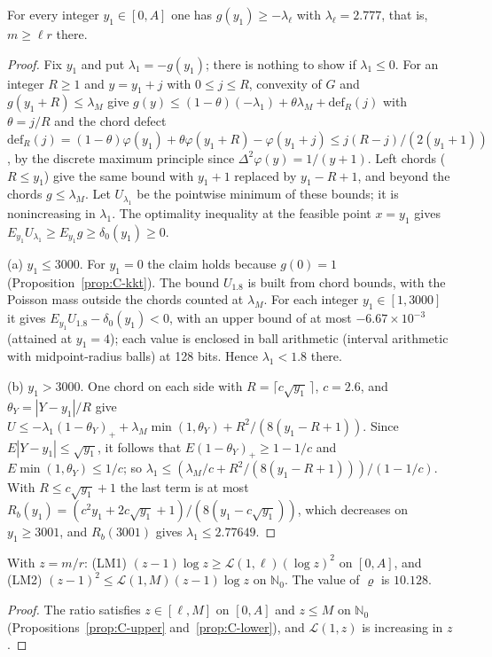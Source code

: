 \begin{proposition}\label{prop:C-lower}
For every integer $y_1\in[0,A]$ one has $g(y_1)\ge-\lambda_\ell$ with $\lambda_\ell=2.777$, that is, $m\ge\ell r$ there.
\end{proposition}
\begin{proof}
Fix $y_1$ and put $\lambda_1=-g(y_1)$; there is nothing to show if $\lambda_1\le0$. For an integer $R\ge1$ and $y=y_1+j$ with $0\le j\le R$, convexity of $G$ and $g(y_1+R)\le\lambda_M$ give $g(y)\le(1-\theta)(-\lambda_1)+\theta\lambda_M+\mathrm{def}_R(j)$ with $\theta=j/R$ and the
chord defect $\mathrm{def}_R(j)=(1-\theta)\varphi(y_1)+\theta\varphi(y_1+R)-\varphi(y_1+j)\le j(R-j)/(2(y_1+1))$, by the discrete maximum
principle since $\Delta^2\varphi(y)=1/(y+1)$. Left chords ($R\le y_1$) give the same bound with $y_1+1$ replaced by $y_1-R+1$, and beyond
the chords $g\le\lambda_M$. Let $U_{\lambda_1}$ be the pointwise minimum of these bounds; it is nonincreasing in $\lambda_1$. The optimality
inequality at the feasible point $x=y_1$ gives $E_{y_1}U_{\lambda_1}\ge E_{y_1}g\ge\delta_0(y_1)\ge0$.

(a) $y_1\le3000$. For $y_1=0$ the claim holds because $g(0)=1$ (Proposition~\ref{prop:C-kkt}). The bound $U_{1.8}$ is built from chord bounds, with the Poisson mass outside the chords counted at
$\lambda_M$. For each integer $y_1\in[1,3000]$ it gives $E_{y_1}U_{1.8}-\delta_0(y_1)<0$, with an upper bound of at most $-6.67\times10^{-3}$
(attained at $y_1=4$); each value is enclosed in ball arithmetic (interval arithmetic with midpoint-radius balls) at 128 bits. Hence $\lambda_1<1.8$ there.

(b) $y_1>3000$. One chord on each side with $R=\lceil c\sqrt{y_1}\,\rceil$, $c=2.6$, and $\theta_Y=|Y-y_1|/R$ give
$U\le-\lambda_1(1-\theta_Y)_++\lambda_M\min(1,\theta_Y)+R^2/(8(y_1-R+1))$. Since $E|Y-y_1|\le\sqrt{y_1}$, it follows that $E(1-\theta_Y)_+\ge1-1/c$ and
$E\min(1,\theta_Y)\le1/c$; so $\lambda_1\le(\lambda_M/c+R^2/(8(y_1-R+1)))/(1-1/c)$. With $R\le c\sqrt{y_1}+1$ the last term is at most
$R_b(y_1)=(c^2y_1+2c\sqrt{y_1}+1)/(8(y_1-c\sqrt{y_1}))$, which decreases on $y_1\ge3001$, and $R_b(3001)$ gives $\lambda_1\le2.77649$.
\end{proof}

\begin{corollary}\label{cor:C-LM}
With $z=m/r$: (LM1) $(z-1)\log z\ge\mathcal L(1,\ell)(\log z)^2$ on $[0,A]$, and (LM2) $(z-1)^2\le\mathcal L(1,M)(z-1)\log z$ on
$\mathbb N_0$. The value of $\varrho$ is $10.128$.
\end{corollary}
\begin{proof}
The ratio satisfies $z\in[\ell,M]$ on $[0,A]$ and $z\le M$ on $\mathbb N_0$ (Propositions~\ref{prop:C-upper} and~\ref{prop:C-lower}), and
$\mathcal L(1,z)$ is increasing in $z$.
\end{proof}

